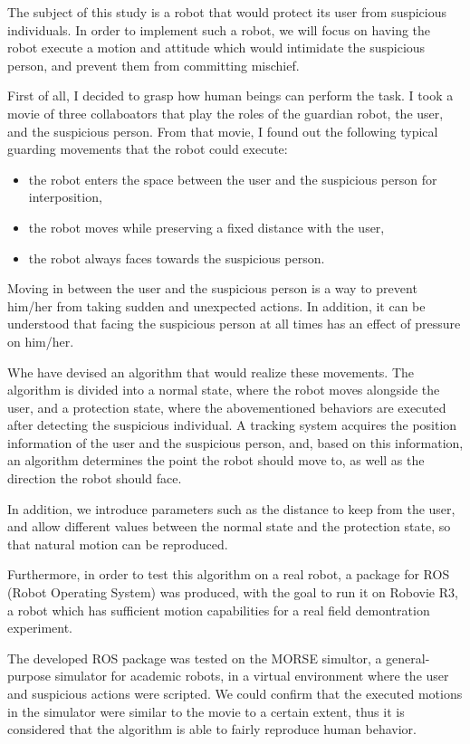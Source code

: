 \documentclass{kuisthesis}
\begin{document}
\begin{eabstract}				%
The subject of this study is a robot that would protect its user from suspicious individuals.
In order to implement such a robot, we will focus on having the robot execute a motion and attitude which would intimidate the suspicious person, and prevent them from committing mischief.

First of all, I decided to grasp how human beings can perform the task. I took a movie of three collaboators that play the roles of the guardian robot, the user, and the suspicious person. From that movie, I found out the following typical guarding movements that the robot could execute:

\begin{itemize}
\item the robot enters the space between the user and the suspicious person for interposition,
\item the robot moves while preserving a fixed distance with the user,
\item the robot always faces towards the suspicious person.
\end{itemize}

Moving in between the user and the suspicious person is a way to prevent him/her from taking sudden and unexpected actions. In addition, it can be understood that facing the suspicious person at all times has an effect of pressure on him/her.

Whe have devised an algorithm that would realize these movements. The algorithm is divided into a normal state, where the robot moves alongside the user, and a protection state, where the abovementioned behaviors are executed after detecting the suspicious individual. A tracking system acquires the position information of the user and the suspicious person, and, based on this information, an algorithm determines the point the robot should move to, as well as the direction the robot should face.

In addition, we introduce parameters such as the distance to keep from the user, and allow different values between the normal state and the protection state, so that natural motion can be reproduced.

Furthermore, in order to test this algorithm on a real robot, a package for ROS (Robot Operating System) was produced, with the goal to run it on Robovie R3, a robot which has sufficient motion capabilities for a real field demontration experiment.

The developed ROS package was tested on the MORSE simultor, a general-purpose simulator for academic robots, in a virtual environment where the user and suspicious actions were scripted. We could confirm that the executed motions in the simulator were similar to the movie to a certain extent, thus it is considered that the algorithm is able to fairly reproduce human behavior.


\end{eabstract}
\end{document}
